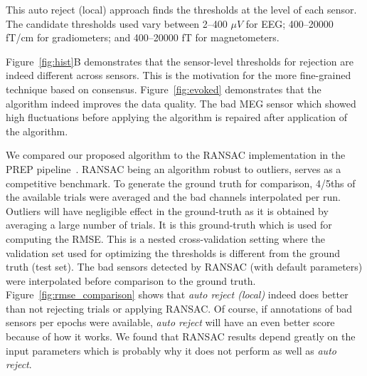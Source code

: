 This auto reject (local) approach finds the thresholds at the level of each sensor. The candidate thresholds used vary between 2--400 $\mu V$ for EEG; 400--20000 fT/cm for gradiometers; and 400--20000 fT for magnetometers.

Figure~\ref{fig:hist}B demonstrates that the sensor-level thresholds for rejection are indeed different across sensors. This is the motivation for the more fine-grained technique based on consensus. \iftoggle{long}{Figure~\ref{fig:fine_reject} shows how the cross-validation curve varies with the consensus percentage and the maximum number of sensors which can be interpolated. Note how increasing both the parameters too much will in fact result in a worse RMSE. This is the reason why $\rho$ and $\kappa$ must be optimized jointly using grid search.}{} Figure~\ref{fig:evoked} demonstrates that the algorithm indeed improves the data quality. The bad MEG sensor which showed high fluctuations before applying the algorithm is repaired after application of the algorithm.

We compared our proposed algorithm to the RANSAC implementation in the PREP pipeline~\citep{bigdely2015prep}. RANSAC being an algorithm robust to outliers, serves as a competitive benchmark. To generate the ground truth for comparison, 4/5ths of the available trials were averaged and the bad channels interpolated per run. Outliers will have negligible effect in the ground-truth as it is obtained by averaging a large number of trials. It is this ground-truth which is used for computing the RMSE. This is a nested cross-validation setting where the validation set used for optimizing the thresholds is different from the ground truth (test set). The bad sensors detected by RANSAC (with default parameters) were interpolated before comparison to the ground truth. Figure~\ref{fig:rmse_comparison} shows that \emph{auto reject (local)} indeed does better than not rejecting trials or applying RANSAC. Of course, if  annotations of bad sensors per epochs were available, \emph{auto reject} will have an even better score because of how it works. We found that RANSAC results depend greatly on the input parameters which is probably why it does not perform as well as \emph{auto reject}.
